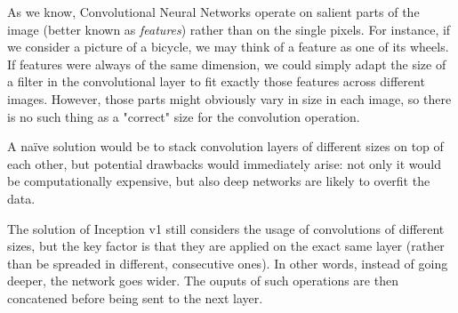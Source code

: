 \documentclass[12pt, twoside, a4paper]{report}
\begin{document}
As we know, Convolutional Neural Networks operate on salient parts of the image (better known as \textit{features}) rather than on the single pixels. For instance, if we consider a picture of a bicycle, we may think of a feature as one of its wheels. If features were always of the same dimension, we could simply adapt the size of a filter in the convolutional layer to fit exactly  those features across different images. However, those parts might obviously vary in size in each image, so there is no such thing as a "correct" size for the convolution operation. 

A na\"ive solution would be to stack convolution layers of different sizes on top of each other, but potential drawbacks would immediately arise: not only it would be computationally expensive, but also deep networks are likely to overfit the data. 

The solution of Inception v1 still considers the usage of convolutions of different sizes, but the key factor is that they are applied on the exact same layer (rather than be spreaded in different, consecutive ones). In other words, instead of going deeper, the network goes wider. The ouputs of such operations are then concatened before being sent to the next layer. 
\end{document}
